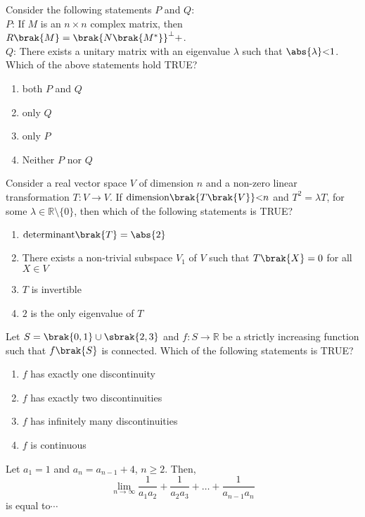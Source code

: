     \item Consider the following statements $P$ and $Q$:\\
       
         $P$: If $M$ is an $n \times n$ complex matrix, then $R\brak{M} = \brak{N\brak{M^*}}^\perp+$.\\
        $Q$: There exists a unitary matrix with an eigenvalue $\lambda$ such that $\abs{\lambda} \text{\textless} 1$.\\
    Which of the above statements hold TRUE?
    \begin{enumerate}
        \item both $P$ and $Q$
        \item only $Q$
        \item only $P$
        \item Neither $P$ nor $Q$
    \end{enumerate}

    \item Consider a real vector space $V$ of dimension $n$ and a non-zero linear transformation $T: V \to V$. If $\text{dimension}\brak{T\brak{V}} \text{\textless} n$ and $T^2 = \lambda T$, for some $\lambda \in \mathbb{R} \setminus \{0\}$, then which of the following statements is TRUE?
    \begin{enumerate}
        \item $\text{determinant}\brak{T} = \abs{2}$
        \item There exists a non-trivial subspace $V_1$ of $V$ such that $T\brak{X} = 0$ for all $X \in V$
        \item $T$ is invertible
        \item $2$ is the only eigenvalue of $T$
    \end{enumerate}

    \item Let $S = \brak{0,1} \cup \sbrak{2,3}$ and $f: S \to \mathbb{R}$ be a strictly increasing function such that $f\brak{S}$ is connected. Which of the following statements is TRUE?
    \begin{enumerate}
        \item $f$ has exactly one discontinuity
        \item $f$ has exactly two discontinuities
        \item $f$ has infinitely many discontinuities
        \item $f$ is continuous
    \end{enumerate}

    \item Let $a_1 = 1$ and $a_n = a_{n-1} + 4$, $n \geq 2$. Then,
    $$\lim_{n \to \infty} \frac{1}{a_1 a_2} + \frac{1}{a_2 a_3} + \dots + \frac{1}{a_{n-1} a_n}$$
    is equal to$\cdots$

